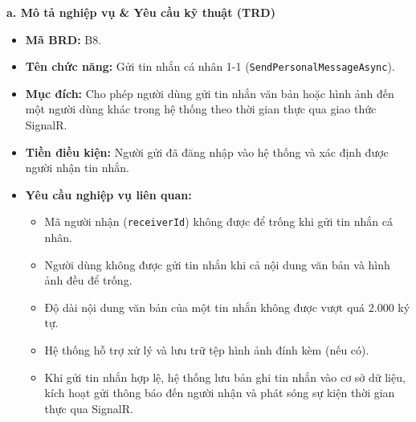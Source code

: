 \documentclass[11pt,a4paper]{article}
\begin{document}
\noindent\textbf{a. Mô tả nghiệp vụ \& Yêu cầu kỹ thuật (TRD)}
\begin{itemize}[leftmargin=1.2cm, noitemsep]
    \item[\textbf{--}] \textbf{Mã BRD:} B8.
    \item[\textbf{--}] \textbf{Tên chức năng:} Gửi tin nhắn cá nhân 1-1 (\texttt{SendPersonalMessageAsync}).
    \item[\textbf{--}] \textbf{Mục đích:} Cho phép người dùng gửi tin nhắn văn bản hoặc hình ảnh đến một người dùng khác trong hệ thống theo thời gian thực qua giao thức SignalR.
    \item[\textbf{--}] \textbf{Tiền điều kiện:} Người gửi đã đăng nhập vào hệ thống và xác định được người nhận tin nhắn.
    \item[\textbf{--}] \textbf{Yêu cầu nghiệp vụ liên quan:}
    \begin{itemize}[leftmargin=0.8cm, label=$\bullet$, noitemsep]
        \item Mã người nhận (\texttt{receiverId}) không được để trống khi gửi tin nhắn cá nhân.
        \item Người dùng không được gửi tin nhắn khi cả nội dung văn bản và hình ảnh đều để trống.
        \item Độ dài nội dung văn bản của một tin nhắn không được vượt quá 2.000 ký tự.
        \item Hệ thống hỗ trợ xử lý và lưu trữ tệp hình ảnh đính kèm (nếu có).
        \item Khi gửi tin nhắn hợp lệ, hệ thống lưu bản ghi tin nhắn vào cơ sở dữ liệu, kích hoạt gửi thông báo đến người nhận và phát sóng sự kiện thời gian thực qua SignalR.
    \end{itemize}
\end{itemize}
\end{document}
